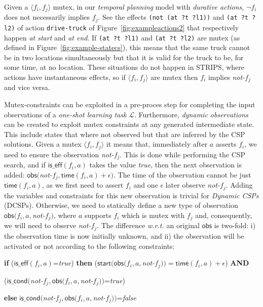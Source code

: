 \documentclass{ecai}
\newcommand{\tup}[1]{{\langle #1 \rangle}}
\newcommand{\iscond}{\mathsf{is\_cond}}    %
\newcommand{\iseff}{\mathsf{is\_eff}}    %
\newcommand{\obs}{\mathsf{obs}}    %
\newcommand{\start}{\mathsf{start}}%
\newcommand{\tim}{\mathsf{time}}   %
\begin{document}
Given a $\tup{f_i, f_j}$ mutex, in our {\em temporal planning} model with {\em durative actions}, $\neg f_i$ does not necessarily implies $f_j$. See the effects \texttt{(not (at ?t ?l1))} and \texttt{(at ?t ?l2)} of action \texttt{drive-truck} of Figure~\ref{fig:exampleactions2} that respectively happen \textit{at start} and \textit{at end}. If \texttt{(at ?t ?l1)} and \texttt{(at ?t ?l2)} are mutex (as defined in Figure~\ref{fig:example-statecs}), this means that the same truck cannot be in two locations simultaneously but that it is valid for the truck to be, for some time, at no location. These situations do not happen in STRIPS, where actions have instantaneous effects, so if $\tup{f_i, f_j}$ are mutex then $f_i$ implies \textit{not-}$f_j$ and vice versa.

Mutex-constraints can be exploited in a pre-proces step for completing the input observations of a {\em one-shot learning task} $\mathcal{L}$. Furthermore, {\em dynamic observations} can be created to exploit mutex constraints at any generated intermediate state. This include states that where not observed but that are inferred by the CSP solutions. Given a mutex $\tup{f_i, f_j}$ it means that, immediately after $a$ asserts $f_i$, we need to ensure the observation \textit{not-}$f_j$. This is done while performing the CSP search, and if $\iseff(f_i,a)$ takes the value \textit{true}, then the next observation is added: $\obs($\textit{not-}$f_j,\tim(f_i,a)+\epsilon)$. The time of the observation cannot be just $\tim(f_i,a)$, as we first need to assert $f_i$ and one $\epsilon$ later observe \textit{not-}$f_j$. Adding the variables and constraints for this new observation is trivial for {\em Dynamic CSPs} (DCSPs). Otherwise, we need to statically define a new type of observation $\obs(f_i,a,$\textit{not-}$f_j)$, where $a$ supports $f_i$ which is mutex with $f_j$ and, consequently, we will need to observe \textit{not-}$f_j$. The difference \textit{w.r.t.} an original $\obs$ is two-fold: i) the observation time is now initially unknown, and ii) the observation will be activated or not according to the following constraints:
\newline

{\scriptsize 
\textbf{if} ($\iseff(f_i,a)$=\textit{true}) \textbf{then} ($\start(\obs(f_i,a,$\textit{not-}$f_j))=\tim(f_i,a)+\epsilon$) \textbf{AND}

\hspace{2.83cm}($\iscond($\textit{not-}$f_j,\obs(f_i,a,$\textit{not-}$f_j))$=\textit{true})

\textbf{else} $\iscond($\textit{not-}$f_j,\obs(f_i,a,$\textit{not-}$f_j))$=\textit{false}
}
\end{document}
